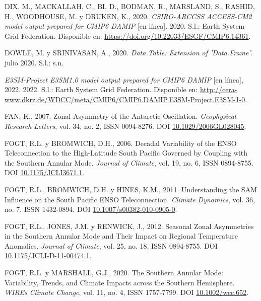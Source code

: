 \documentclass[12pt,oneside,a4paper]{reedthesis}
\newlength{\cslhangindent}
\newenvironment{CSLReferences}[2] %
 {%
  \setlength{\parindent}{0pt}
  \ifodd #1 \everypar{\setlength{\hangindent}{\cslhangindent}}\ignorespaces\fi
  \ifnum #2 > 0
  \setlength{\parskip}{#2\baselineskip}
  \fi
 }%
 {}
\begin{document}
\begin{CSLReferences}{1}{0}
\leavevmode{}%
DIX, M., MACKALLAH, C., BI, D., BODMAN, R., MARSLAND, S., RASHID, H., WOODHOUSE, M. y DRUKEN, K., 2020. \emph{CSIRO-ARCCSS ACCESS-CM2 model output prepared for CMIP6 DAMIP} {[}en línea{]}. 2020. S.l.: Earth System Grid Federation. Disponible en: \url{https://doi.org/10.22033/ESGF/CMIP6.14361}.

\leavevmode{}%
DOWLE, M. y SRINIVASAN, A., 2020. \emph{Data.Table: {Extension} of 'Data.Frame'}. julio 2020. S.l.: s.n.

\leavevmode{}%
\emph{E3SM-Project E3SM1.0 model output prepared for CMIP6 DAMIP} {[}en línea{]}, 2022. 2022. S.l.: Earth System Grid Federation. Disponible en: \url{http://cera-www.dkrz.de/WDCC/meta/CMIP6/CMIP6.DAMIP.E3SM-Project.E3SM-1-0}.

\leavevmode{}%
FAN, K., 2007. Zonal Asymmetry of the {Antarctic Oscillation}. \emph{Geophysical Research Letters}, vol. 34, no. 2, ISSN 0094-8276. DOI \href{https://doi.org/10.1029/2006GL028045}{10.1029/2006GL028045}.

\leavevmode{}%
FOGT, R.L. y BROMWICH, D.H., 2006. Decadal {Variability} of the {ENSO Teleconnection} to the {High-Latitude South Pacific Governed} by {Coupling} with the {Southern Annular Mode}. \emph{Journal of Climate}, vol. 19, no. 6, ISSN 0894-8755. DOI \href{https://doi.org/10.1175/JCLI3671.1}{10.1175/JCLI3671.1}.

\leavevmode{}%
FOGT, R.L., BROMWICH, D.H. y HINES, K.M., 2011. Understanding the {SAM} Influence on the {South Pacific ENSO} Teleconnection. \emph{Climate Dynamics}, vol. 36, no. 7, ISSN 1432-0894. DOI \href{https://doi.org/10.1007/s00382-010-0905-0}{10.1007/s00382-010-0905-0}.

\leavevmode{}%
FOGT, R.L., JONES, J.M. y RENWICK, J., 2012. Seasonal {Zonal Asymmetries} in the {Southern Annular Mode} and {Their Impact} on {Regional Temperature Anomalies}. \emph{Journal of Climate}, vol. 25, no. 18, ISSN 0894-8755. DOI \href{https://doi.org/10.1175/JCLI-D-11-00474.1}{10.1175/JCLI-D-11-00474.1}.

\leavevmode{}%
FOGT, R.L. y MARSHALL, G.J., 2020. The {Southern Annular Mode}: {Variability}, Trends, and Climate Impacts across the {Southern Hemisphere}. \emph{WIREs Climate Change}, vol. 11, no. 4, ISSN 1757-7799. DOI \href{https://doi.org/10.1002/wcc.652}{10.1002/wcc.652}.


\end{CSLReferences}
\end{document}
